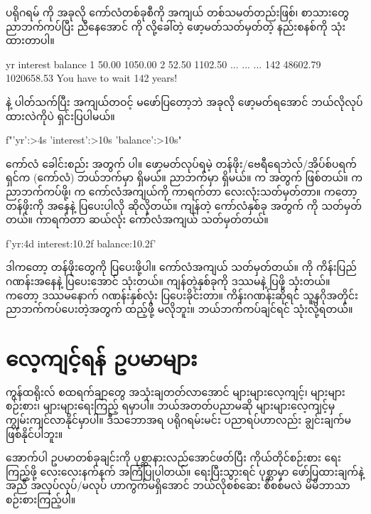ပရိုဂရမ်  ကို အခုလို ကော်လံတစ်ခုစီကို အကျယ် တစ်သမတ်တည်းဖြစ်၊ စာသားတွေ ညာဘက်ကပ်ပြီး ညီနေအောင်  ကို  လို့ခေါ်တဲ့ ဖော့မတ်သတ်မှတ်တဲ့ နည်းစနစ်ကို သုံးထားတာပါ။
\begin{codetxt}
  yr   interest    balance
   1      50.00    1050.00
   2      52.50    1102.50
 ...      ...      ...    
 142   48602.79 1020658.53
You have to wait 142 years!
\end{codetxt}
 နဲ့ ပါတ်သက်ပြီး အကျယ်တဝင့် မဖော်ပြတော့ဘဲ အခုလို ဖော့မတ်ရအောင် ဘယ်လိုလုပ်ထားလဲကိုပဲ ရှင်းပြပါမယ်။
%
\begin{py}
f"{'yr':>4s} {'interest':>10s} {'balance':>10s}"
\end{py}
%
ကော်လံ ခေါင်းစည်း အတွက်  ပါ။ ဖော့မတ်လုပ်ရမဲ့ တန်ဖိုး/ဗေရီရေဘဲလ်/အိပ်စ်ပရက်ရှင်က \fCode{:} (ကော်လံ) ဘယ်ဘက်မှာ ရှိမယ်။ ညာဘက်မှာ   ရှိမယ်။  က  အတွက်  ဖြစ်တယ်။ \fCodeBf{>} က ညာဘက်ကပ်ဖို့၊  က ကော်လံအကျယ်ကို ကာရက်တာ လေးလုံးသတ်မှတ်တာ။  ကတော့ တန်ဖိုးကို  အနေနဲ့ ပြပေးပါလို ဆိုလိုတယ်။ ကျန်တဲ့ ကော်လံနှစ်ခု အတွက်  ကို  သတ်မှတ်တယ်။  ကာရက်တာ ဆယ်လုံး ကော်လံအကျယ် သတ်မှတ်တယ်။
%
\begin{py}
f'{yr:4d} {interest:10.2f} {balance:10.2f}'
\end{py}
%
ဒါကတော့ \fEn{,} \fEn{,}  တန်ဖိုးတွေကို ပြပေးဖို့ပါ။ ကော်လံအကျယ် \fEn{,} \fEn{,}  သတ်မှတ်တယ်။  ကို ကိန်းပြည်ဂဏန်းအနေနဲ့ ပြပေးအောင်  သုံးတယ်။ ကျန်တဲ့နှစ်ခုကို ဒဿမနဲ့ ပြဖို့  သုံးတယ်။  ကတော့ ဒဿမနောက် ဂဏန်းနှစ်လုံး ပြပေးခိုင်းတာ။ ကိန်းဂဏန်းဆိုရင် သူ့နဂိုအတိုင်း ညာဘက်ကပ်ပေးတဲ့အတွက် \fCode{>} ထည့်ဖို့ မလိုဘူး။ ဘယ်ဘက်ကပ်ချင်ရင် \fCode{<} သုံးလို့ရတယ်။

\section{လေ့ကျင့်ရန် ဥပမာများ}

ကွန်ထရိုးလ် စထရက်ချာတွေ အသုံးချတတ်လာအောင် များများလေ့ကျင့်၊ များများစဉ်းစား၊ များများရေးကြည့် ရမှာပါ။ ဘယ်အတတ်ပညာမဆို များများလေ့ကျင့်မှ ကျွမ်းကျင်လာနိုင်မှာပါ။ ဒီသဘောအရ ပရိုဂရမ်းမင်း ပညာရပ်ဟာလည်း ချွင်းချက်မဖြစ်နိုင်ပါဘူး။

\begin{mytcbox}
အောက်ပါ ဥပမာတစ်ခုချင်းကို ပုစ္ဆာနားလည်အောင်ဖတ်ပြီး ကိုယ်တိုင်စဉ်းစား ရေးကြည့်ဖို့ လေးလေးနက်နက် အကြံပြုပါတယ်။ ရေးပြီးသွားရင် ပုစ္ဆာမှာ ဖော်ပြထားချက်နဲ့ အညီ အလုပ်လုပ်/မလုပ် ဟာကွက်မရှိအောင် ဘယ်လိုစစ်ဆေး စိစစ်မလဲ မိမိဘာသာ စဉ်းစားကြည့်ပါ။
\end{mytcbox}

